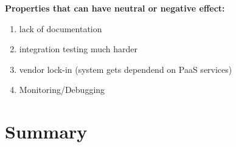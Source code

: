 \textbf{Properties that can have neutral or negative effect:}
\begin{enumerate}
    \item lack of documentation
    \item integration testing much harder
    \item vendor lock-in (system gets dependend on PaaS services)
    \item Monitoring/Debugging
\end{enumerate}

\section{Summary}
